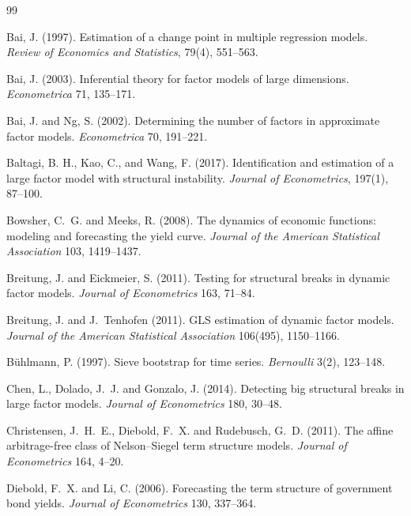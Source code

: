 \documentclass[11pt]{article}
\begin{document}
\begin{thebibliography}{99}

Bai, J. (1997). Estimation of a change point in multiple regression models. \emph{Review of Economics and Statistics}, 79(4), 551--563.

Bai, J. (2003). Inferential theory for factor models of large dimensions. \emph{Econometrica} 71, 135--171.

Bai, J. and Ng, S. (2002). Determining the number of factors in approximate factor models. \emph{Econometrica} 70, 191--221.

Baltagi, B. H., Kao, C., and Wang, F. (2017). Identification and estimation of a large factor model with structural instability. \emph{Journal of Econometrics}, 197(1), 87--100.

Bowsher, C.~G. and Meeks, R. (2008). The dynamics of economic functions: modeling and forecasting the yield curve. \emph{Journal of the American Statistical Association} 103, 1419--1437.

Breitung, J. and Eickmeier, S. (2011). Testing for structural breaks in dynamic factor models. \emph{Journal of Econometrics} 163, 71--84.

Breitung, J. and J.~Tenhofen (2011). GLS estimation of dynamic factor models. \emph{Journal of the American Statistical Association} 106(495), 1150--1166.

B\"uhlmann, P. (1997). Sieve bootstrap for time series. \emph{Bernoulli} 3(2), 123--148.

Chen, L., Dolado, J.~J. and Gonzalo, J. (2014). Detecting big structural breaks in large factor models. \emph{Journal of Econometrics} 180, 30--48.

Christensen, J.~H.~E., Diebold, F.~X. and Rudebusch, G.~D. (2011). The affine arbitrage-free class of Nelson--Siegel term structure models. \emph{Journal of Econometrics} 164, 4--20.

Diebold, F.~X. and Li, C. (2006). Forecasting the term structure of government bond yields. \emph{Journal of Econometrics} 130, 337--364.


\end{thebibliography}
\end{document}
